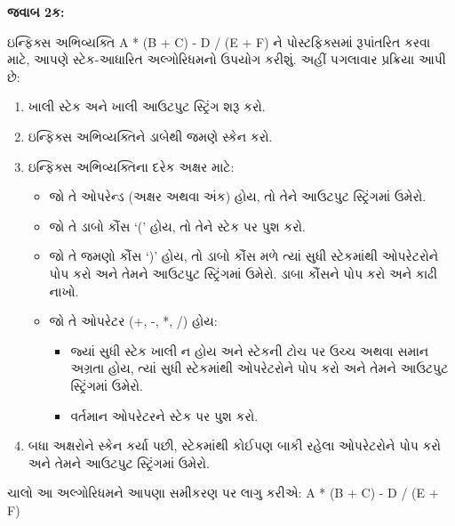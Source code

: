 \textbf{જવાબ 2ક:}

ઇન્ફિક્સ અભિવ્યક્તિ A * (B + C) - D / (E + F) ને પોસ્ટફિક્સમાં રૂપાંતરિત કરવા માટે,
આપણે સ્ટેક-આધારિત અલ્ગોરિધમનો ઉપયોગ કરીશું. અહીં પગલાવાર પ્રક્રિયા આપી છે:

\begin{enumerate}
\def\labelenumi{\arabic{enumi}.}
\tightlist
\item
  ખાલી સ્ટેક અને ખાલી આઉટપુટ સ્ટ્રિંગ શરૂ કરો.
\item
  ઇન્ફિક્સ અભિવ્યક્તિને ડાબેથી જમણે સ્કેન કરો.
\item
  ઇન્ફિક્સ અભિવ્યક્તિના દરેક અક્ષર માટે:

  \begin{itemize}
  \tightlist
  \item
    જો તે ઓપરેન્ડ (અક્ષર અથવા અંક) હોય, તો તેને આઉટપુટ સ્ટ્રિંગમાં ઉમેરો.
  \item
    જો તે ડાબો કૌંસ `(' હોય, તો તેને સ્ટેક પર પુશ કરો.
  \item
    જો તે જમણો કૌંસ `)' હોય, તો ડાબો કૌંસ મળે ત્યાં સુધી સ્ટેકમાંથી ઓપરેટરોને પોપ
    કરો અને તેમને આઉટપુટ સ્ટ્રિંગમાં ઉમેરો. ડાબા કૌંસને પોપ કરો અને કાઢી નાખો.
  \item
    જો તે ઓપરેટર (+, -, *, /) હોય:

    \begin{itemize}
    \tightlist
    \item
      જ્યાં સુધી સ્ટેક ખાલી ન હોય અને સ્ટેકની ટોચ પર ઉચ્ચ અથવા સમાન અગ્રતા હોય,
      ત્યાં સુધી સ્ટેકમાંથી ઓપરેટરોને પોપ કરો અને તેમને આઉટપુટ સ્ટ્રિંગમાં ઉમેરો.
    \item
      વર્તમાન ઓપરેટરને સ્ટેક પર પુશ કરો.
    \end{itemize}
  \end{itemize}
\item
  બધા અક્ષરોને સ્કેન કર્યા પછી, સ્ટેકમાંથી કોઈપણ બાકી રહેલા ઓપરેટરોને પોપ કરો અને
  તેમને આઉટપુટ સ્ટ્રિંગમાં ઉમેરો.
\end{enumerate}

ચાલો આ અલ્ગોરિધમને આપણા સમીકરણ પર લાગુ કરીએ: A * (B + C) - D / (E + F)

